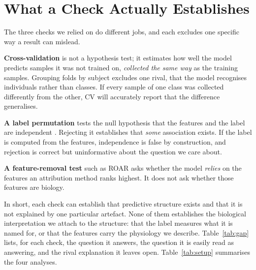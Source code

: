 \documentclass[conference]{IEEEtran}
\begin{document}
\section{What a Check Actually Establishes}
\label{sec:checks}

The three checks we relied on do different jobs, and each excludes one
specific way a result can mislead.

\textbf{Cross-validation} is not a hypothesis test; it estimates how well
the model predicts samples it was not trained on, \emph{collected the same
way} as the training samples. Grouping folds by subject excludes one rival,
that the model recognises individuals rather than classes. If every sample
of one class was collected differently from the other, CV will accurately
report that the difference generalises.

\textbf{A label permutation} tests the null hypothesis that the features and
the label are independent \cite{ojala2010}. Rejecting it establishes that
\emph{some} association exists. If the label is computed from the features,
independence is false by construction, and rejection is correct but
uninformative about the question we care about.

\textbf{A feature-removal test} such as ROAR \cite{hooker2019} asks whether
the model \emph{relies} on the features an attribution method ranks highest.
It does not ask whether those features are biology.

In short, each check can establish that predictive structure exists and that
it is not explained by one particular artefact. None of them establishes the
biological interpretation we attach to the structure: that the label
measures what it is named for, or that the features carry the physiology we
describe. Table~\ref{tab:gap} lists, for each check, the question it
answers, the question it is easily read as answering, and the rival
explanation it leaves open. Table~\ref{tab:setup} summarises the four
analyses.
\end{document}
